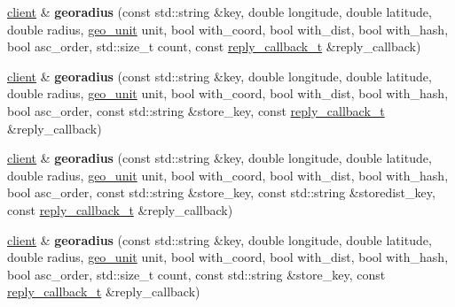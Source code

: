 \begin{DoxyCompactItemize}
\mbox{\hyperlink{classcpp__redis_1_1client}{client}} \& {\bfseries georadius} (const std\+::string \&key, double longitude, double latitude, double radius, \mbox{\hyperlink{classcpp__redis_1_1client_aa5998536fd32ff4387c89be514997620}{geo\+\_\+unit}} unit, bool with\+\_\+coord, bool with\+\_\+dist, bool with\+\_\+hash, bool asc\+\_\+order, std\+::size\+\_\+t count, const \mbox{\hyperlink{classcpp__redis_1_1client_af7a65eb21aa25230bfbb0b0203c4fc04}{reply\+\_\+callback\+\_\+t}} \&reply\+\_\+callback)
\item 
\mbox{\label{classcpp__redis_1_1client_a056cb00941824bb8d20afd9172f76546}} 
\mbox{\hyperlink{classcpp__redis_1_1client}{client}} \& {\bfseries georadius} (const std\+::string \&key, double longitude, double latitude, double radius, \mbox{\hyperlink{classcpp__redis_1_1client_aa5998536fd32ff4387c89be514997620}{geo\+\_\+unit}} unit, bool with\+\_\+coord, bool with\+\_\+dist, bool with\+\_\+hash, bool asc\+\_\+order, const std\+::string \&store\+\_\+key, const \mbox{\hyperlink{classcpp__redis_1_1client_af7a65eb21aa25230bfbb0b0203c4fc04}{reply\+\_\+callback\+\_\+t}} \&reply\+\_\+callback)
\item 
\mbox{\label{classcpp__redis_1_1client_a5f5cf736292940d88533b2d305ebc670}} 
\mbox{\hyperlink{classcpp__redis_1_1client}{client}} \& {\bfseries georadius} (const std\+::string \&key, double longitude, double latitude, double radius, \mbox{\hyperlink{classcpp__redis_1_1client_aa5998536fd32ff4387c89be514997620}{geo\+\_\+unit}} unit, bool with\+\_\+coord, bool with\+\_\+dist, bool with\+\_\+hash, bool asc\+\_\+order, const std\+::string \&store\+\_\+key, const std\+::string \&storedist\+\_\+key, const \mbox{\hyperlink{classcpp__redis_1_1client_af7a65eb21aa25230bfbb0b0203c4fc04}{reply\+\_\+callback\+\_\+t}} \&reply\+\_\+callback)
\item 
\mbox{\label{classcpp__redis_1_1client_a24ecf7d69b13f1f2e5a1250e83f1379f}} 
\mbox{\hyperlink{classcpp__redis_1_1client}{client}} \& {\bfseries georadius} (const std\+::string \&key, double longitude, double latitude, double radius, \mbox{\hyperlink{classcpp__redis_1_1client_aa5998536fd32ff4387c89be514997620}{geo\+\_\+unit}} unit, bool with\+\_\+coord, bool with\+\_\+dist, bool with\+\_\+hash, bool asc\+\_\+order, std\+::size\+\_\+t count, const std\+::string \&store\+\_\+key, const \mbox{\hyperlink{classcpp__redis_1_1client_af7a65eb21aa25230bfbb0b0203c4fc04}{reply\+\_\+callback\+\_\+t}} \&reply\+\_\+callback)

\end{DoxyCompactItemize}

